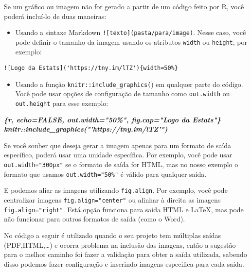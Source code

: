 \documentclass[
]{book}
\newenvironment{Shaded}{\begin{snugshade}}{\end{snugshade}}
\newcommand{\InformationTok}[1]{\textcolor[rgb]{0.56,0.35,0.01}{\textbf{\textit{#1}}}}
\providecommand{\tightlist}{%
  \setlength{\itemsep}{0pt}\setlength{\parskip}{0pt}}
\begin{document}
Se um gráfico ou imagem não for gerado a partir de um código feito por R, você poderá incluí-lo de duas maneiras:

\begin{itemize}
\tightlist
\item
  Usando a sintaxe Markdown \texttt{!{[}texto{]}(pasta/para/image)}. Nesse caso, você pode definir o tamanho da imagem usando os atributos \texttt{width} ou \texttt{height}, por exemplo:
\end{itemize}

\begin{verbatim}
![Logo da Estats]('https://tny.im/lTZ'){width=50%}
\end{verbatim}

\begin{itemize}
\tightlist
\item
  Usando a função \texttt{knitr::include\_graphics(}) em qualquer parte do código. Você pode usar opções de configuração de tamanho como \texttt{out.width} ou \texttt{out.height} para esse exemplo:
\end{itemize}

\begin{Shaded}
\begin{Highlighting}[]
\InformationTok{\textasciigrave{}\textasciigrave{}\textasciigrave{}\{r, echo=FALSE, out.width="50\%", fig.cap="Logo da Estats"\}}
\InformationTok{knitr::include\_graphics("'https://tny.im/lTZ'")}
\InformationTok{\textasciigrave{}\textasciigrave{}\textasciigrave{}}
\end{Highlighting}
\end{Shaded}

Se você souber que deseja gerar a imagem apenas para um formato de saída específico, poderá usar uma unidade específica. Por exemplo, você pode usar \texttt{out.width="300px"} se o formato de saída for HTML, mas no nosso exemplo o formato que usamos \texttt{out.width="50\%"} é válido para qualquer saída.

E podemos aliar as imagens utilizando \texttt{fig.align}. Por exemplo, você pode centralizar imagens \texttt{fig.align="center"} ou alinhar à direita as imagens \texttt{fig.align="right\textquotesingle{}"}. Está opção funciona para saída HTML e LaTeX, mas pode não funcionar para outros formatos de saída (como o Word).

No código a seguir é utilizado quando o seu projeto tem múltiplas saídas (PDF,HTML,\ldots) e ocorra problema na inclusão das imagens, então a sugestão para o melhor caminho foi fazer a validação para obter a saída utilizada, sabendo disso podemos fazer configuração e inserindo imagens especifica para cada saída.
\end{document}
